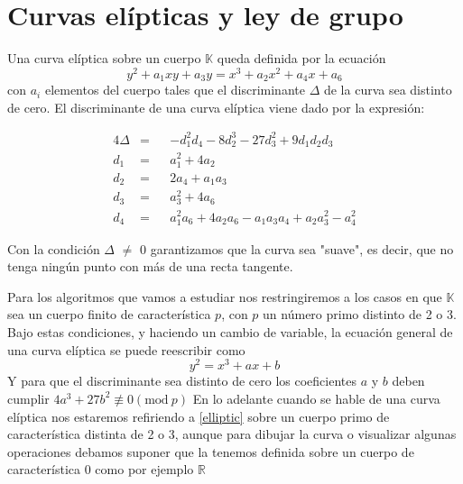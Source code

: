 \section{Curvas elípticas y ley de grupo}\label{curvas_grupo}
\theoremstyle{definition}\begin{definition}\label{curv_ellipt}
Una curva elíptica sobre un cuerpo $\mathbb{K}$ queda definida por la ecuación \[y^2 +a_1xy+a_3 y = x^3 +a_2x^2 +a_4x +a_6\] con $a_i$ elementos del cuerpo tales que el discriminante $\Delta$ de la curva sea distinto de cero.
El discriminante de una curva elíptica viene dado por la expresión:


\begin{alignat*}{4}
\Delta & {}={} & & -d_1^2d_4 - 8d_2^3 - 27d_3^2 + 9d_1d_2d_3 \\
d_1 & {}={} &  & a_1^2 + 4a_2 \\
d_2 & {}={} &  & 2a_4 + a_1a_3 \\
d_3 & {}={} &  & a_3^2 + 4a_6 \\
d_4 & {}={} &  & a_1^2a_6 + 4a_2a_6 - a_1a_3a_4 + a_2a_3^2 - a_4^2
\end{alignat*}

Con la condición $\Delta$ $\neq$ 0 garantizamos que la curva sea "suave", es decir, que no tenga ningún punto con más de una recta tangente.
\end{definition} Para los algoritmos que vamos a estudiar nos restringiremos a los casos en que $\mathbb{K}$ sea un cuerpo finito de característica $p$, con $p$ un número primo distinto de 2 o 3. Bajo estas condiciones, y haciendo un cambio de variable, la ecuación general de una curva elíptica se puede reescribir como \begin{equation} \label{elliptic}y^2 = x^3 + ax + b \end{equation} Y para que el discriminante sea distinto de cero los coeficientes $a$ y $b$ deben cumplir $4a^3 + 27b^2 \not\equiv 0(\textrm{mod}\ p)$ En lo adelante cuando se hable de una curva elíptica nos estaremos refiriendo a \ref{elliptic} sobre un cuerpo primo de característica distinta de 2 o 3, aunque para dibujar la curva o visualizar algunas operaciones debamos suponer que la tenemos definida sobre un cuerpo de característica 0 como por ejemplo $\mathbb{R}$

